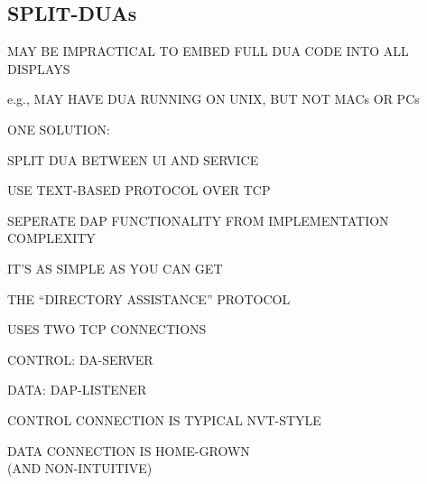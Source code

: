\begin{bwslide}
\part*	{SPLIT-DUAs}\bf

\begin{nrtc}
\item	MAY BE IMPRACTICAL TO EMBED FULL DUA CODE INTO ALL DISPLAYS
    \begin{nrtc}
    \item	e.g., MAY HAVE DUA RUNNING ON UNIX, BUT NOT MACs OR PCs
    \end{nrtc}

\item	ONE SOLUTION:
    \begin{nrtc}
    \item	SPLIT DUA BETWEEN UI AND SERVICE
    \end{nrtc}

\item	USE TEXT-BASED PROTOCOL OVER TCP
    \begin{nrtc}
    \item	SEPERATE DAP FUNCTIONALITY FROM IMPLEMENTATION COMPLEXITY

    \item	IT'S AS SIMPLE AS YOU CAN GET
    \end{nrtc}
    THE ``DIRECTORY ASSISTANCE'' PROTOCOL
\end{nrtc}
\end{bwslide}




\begin{bwslide}

\begin{nrtc}
\item	USES TWO TCP CONNECTIONS
    \begin{nrtc}
    \item	CONTROL: DA-SERVER

    \item	DATA: DAP-LISTENER
    \end{nrtc}

\item	CONTROL CONNECTION IS TYPICAL NVT-STYLE

\item	DATA CONNECTION IS HOME-GROWN\\ (AND NON-INTUITIVE)
\end{nrtc}
\end{bwslide}


